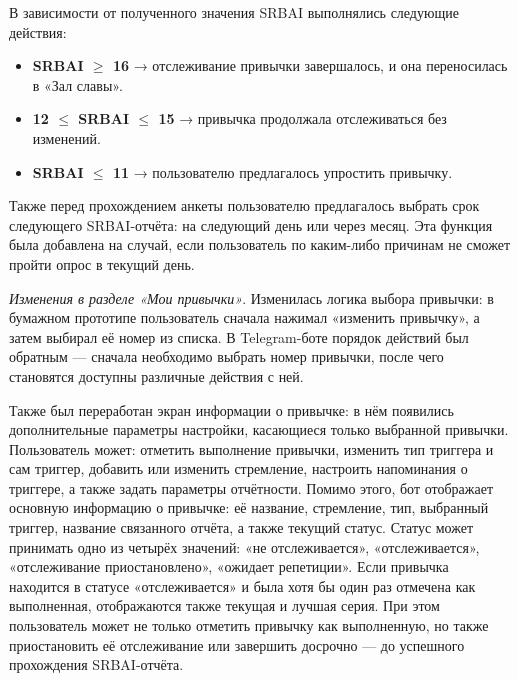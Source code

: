 \documentclass[pdflatex,sn-mathphys-num]{sn-jnl}%
\theoremstyle{thmstyleone}%
\theoremstyle{thmstyletwo}%
\theoremstyle{thmstylethree}%
\begin{document}
В зависимости от полученного значения SRBAI выполнялись следующие действия:

\begin{itemize}
    \item \textbf{SRBAI $\geq$ 16} → отслеживание привычки завершалось, и она переносилась в «Зал славы».
    \item \textbf{12 $\leq$ SRBAI $\leq$ 15} → привычка продолжала отслеживаться без изменений.
    \item \textbf{SRBAI $\leq$ 11} → пользователю предлагалось упростить привычку.
\end{itemize}

Также перед прохождением анкеты пользователю предлагалось выбрать срок следующего SRBAI-отчёта: на следующий день или через месяц. Эта функция была добавлена на случай, если пользователь по каким-либо причинам не сможет пройти опрос в текущий день.

\textit{Изменения в разделе «Мои привычки»}. Изменилась логика выбора привычки: в бумажном прототипе пользователь сначала нажимал «изменить привычку», а затем выбирал её номер из списка. В Telegram-боте порядок действий был обратным — сначала необходимо выбрать номер привычки, после чего становятся доступны различные действия с ней. 

Также был переработан экран информации о привычке: в нём появились дополнительные параметры настройки, касающиеся только выбранной привычки. Пользователь может:
отметить выполнение привычки, изменить тип триггера и сам триггер, добавить или изменить стремление, настроить напоминания о триггере, а также задать параметры отчётности. Помимо этого, бот отображает основную информацию о привычке: её название, стремление, тип, выбранный триггер, название связанного отчёта, а также текущий статус. Статус может принимать одно из четырёх значений: «не отслеживается», «отслеживается», «отслеживание приостановлено», «ожидает репетиции». Если привычка находится в статусе «отслеживается» и была хотя бы один раз отмечена как выполненная, отображаются также текущая и лучшая серия. При этом пользователь может не только отметить привычку как выполненную, но также приостановить её отслеживание или завершить досрочно — до успешного прохождения SRBAI-отчёта.
\end{document}
